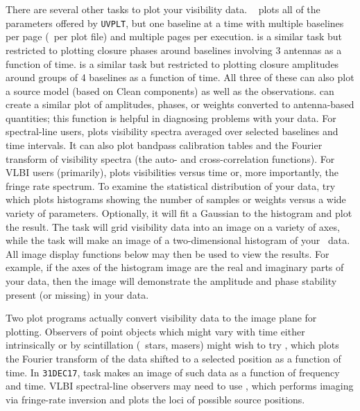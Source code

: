      There are several other tasks to plot your visibility data.  {\tt
{}} plots all of the parameters offered by {\tt UVPLT}, but
one baseline at a time with multiple baselines per page (\ie\ per plot
file) and multiple pages per execution.  {\tt {}} is a
similar task but restricted to plotting closure phases around baselines
involving 3 antennas as a function of time.  {\tt {}} is a
similar task but restricted to plotting closure amplitudes around
groups of 4 baselines as a function of time.  All three of these
can also plot a source model (based on Clean components) as well as
the observations.  {\tt {}} can create a similar plot of
amplitudes, phases, or weights converted to antenna-based quantities;
this function is helpful in diagnosing problems with your data.  For
spectral-line users, {\tt {}} plots visibility spectra
averaged over selected baselines and time intervals.  It can also plot
bandpass calibration tables and the Fourier transform of visibility
spectra (the auto- and cross-correlation functions).  For VLBI users
(primarily), {\tt {}} plots visibilities versus time or,
more importantly, the fringe rate spectrum.  To examine the
statistical distribution of your data, try {\tt {}} which
plots histograms showing the number of samples or weights versus a
wide variety of parameters. Optionally, it will fit a Gaussian to the
histogram and plot the result.  The task {\tt {}} will grid
visibility data into an image on a variety of axes, while the task
{\tt {}} will make an image of a two-dimensional histogram
of your \uv\ data.  All image display functions below may then be used
to view the results.  For example, if the axes of the histogram image
are the real and imaginary parts of your data, then the image will
demonstrate the amplitude and phase stability present (or missing) in
your data.

     Two plot programs actually convert visibility data to the image
plane for plotting.   Observers of point objects which might vary with
time either intrinsically or by scintillation (\eg\ stars, masers)
might wish to try {\tt {}}, which plots the Fourier
transform of the data shifted to a selected position as a function of
time.  In {\tt 31DEC17}, task {\tt {}} makes an image of
such data as a function of frequency and time.  VLBI spectral-line
observers may need to use {\tt {}}, which performs imaging
via fringe-rate inversion and plots the loci of possible source
positions.

